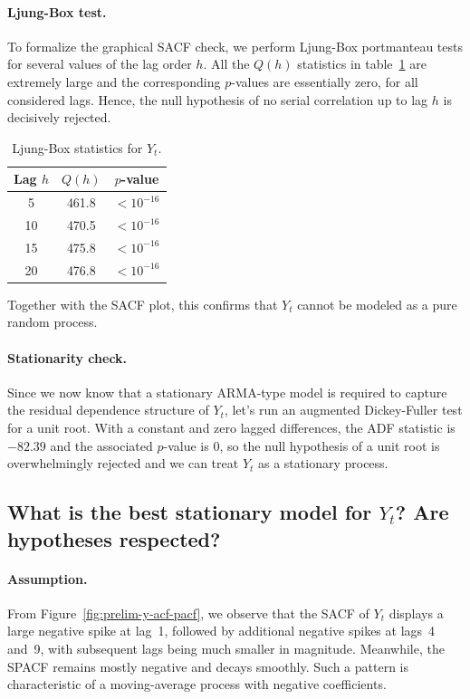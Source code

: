 \documentclass[11pt, a4paper]{article}
\begin{document}
\paragraph{Ljung-Box test.}
To formalize the graphical SACF check, we perform Ljung-Box portmanteau tests for several values of the lag order $h$. All the $Q(h)$ statistics in table~\ref{tab:yt-ljungbox} are extremely large and the corresponding $p$-values are essentially zero, for all considered lags. Hence, the null hypothesis of no serial correlation up to lag $h$ is decisively rejected. 

\begin{table}[H]
  \centering
  \caption{Ljung-Box statistics for $Y_t$.}
  \label{tab:yt-ljungbox}
  \begin{tabular}{ccc}
    \hline
    Lag $h$ & $Q(h)$ & $p$-value \\
    \hline
     5  & 461.8 & $<10^{-16}$ \\
    10  & 470.5 & $<10^{-16}$ \\
    15  & 475.8 & $<10^{-16}$ \\
    20  & 476.8 & $<10^{-16}$ \\
    \hline
  \end{tabular}
\end{table}

Together with the SACF plot, this confirms that $Y_t$ cannot be modeled as a pure random process.

\paragraph{Stationarity check.}
Since we now know that a stationary ARMA-type model is required to capture the residual dependence structure of $Y_t$, let's run an augmented Dickey-Fuller test for a unit root. With a constant and zero lagged differences, the ADF statistic is $-82.39$ and the associated $p$-value is $0$, so the null hypothesis of a unit root is overwhelmingly rejected and we can treat $Y_t$ as a stationary process.

\subsection{What is the best stationary model for $Y_t$? Are hypotheses respected?}

\paragraph{Assumption.}
From Figure~\ref{fig:prelim-y-acf-pacf}, we observe that the SACF of $Y_t$ displays a large negative spike at lag~1, followed by additional negative spikes at lags~4 and~9, with subsequent lags being much smaller in magnitude. Meanwhile, the SPACF remains mostly negative and decays smoothly. Such a pattern is characteristic of a moving-average process with negative coefficients.
\end{document}
